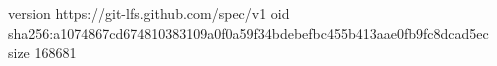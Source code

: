 version https://git-lfs.github.com/spec/v1
oid sha256:a1074867cd674810383109a0f0a59f34bdebefbc455b413aae0fb9fc8dcad5ec
size 168681
